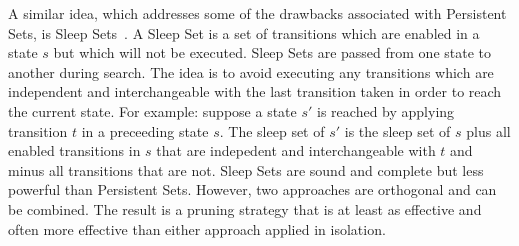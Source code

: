 A similar idea, which addresses some of the drawbacks associated with Persistent Sets, is 
Sleep Sets~\citep{godefroid93,godefroid96}. A Sleep Set is a set of transitions which are
enabled in a state $s$ but which will not be executed. Sleep Sets are passed from one state to 
another during search. The idea is to avoid executing any transitions which are independent and
interchangeable with the last transition taken in order to reach the current state.
For example: suppose a state $s'$ is reached by applying transition $t$ in a preceeding state $s$.
The sleep set of $s'$ is the sleep set of $s$ plus all enabled transitions in $s$ that 
are indepedent and interchangeable with $t$ and minus all transitions that are not.
Sleep Sets are sound and complete but less powerful than Persistent Sets. However, two approaches 
are orthogonal and can be combined. The result is a pruning strategy that is at least as effective
and often more effective than either approach applied in isolation.

